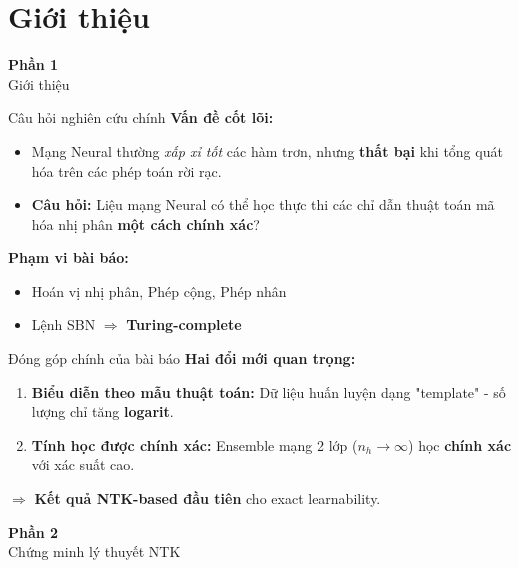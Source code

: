 
\section{Giới thiệu}

\begin{frame}{}
  \centering
  \vfill
  {\Huge \textbf{Phần 1}}\\[0.5cm]
  {\Large Giới thiệu}
  \vfill
\end{frame}

\begin{frame}{Câu hỏi nghiên cứu chính}
  \textbf{Vấn đề cốt lõi:}
  \begin{itemize}
    \item Mạng Neural thường \emph{xấp xỉ tốt} các hàm trơn, nhưng \textbf{thất bại} khi tổng quát hóa trên các phép toán rời rạc.
    \item \textbf{Câu hỏi:} Liệu mạng Neural có thể học thực thi các chỉ dẫn thuật toán mã hóa nhị phân \textbf{một cách chính xác}?
  \end{itemize}

  \vspace{0.3cm}
  \textbf{Phạm vi bài báo:}
  \begin{itemize}
    \item Hoán vị nhị phân, Phép cộng, Phép nhân
    \item Lệnh SBN $\Rightarrow$ \textbf{Turing-complete}
  \end{itemize}
\end{frame}

\begin{frame}{Đóng góp chính của bài báo}
  \textbf{Hai đổi mới quan trọng:}
  \begin{enumerate}
    \item \textbf{Biểu diễn theo mẫu thuật toán:} Dữ liệu huấn luyện dạng "template" - số lượng chỉ tăng \textbf{logarit}.
    \item \textbf{Tính học được chính xác:} Ensemble mạng 2 lớp ($n_h \to \infty$) học \textbf{chính xác} với xác suất cao.
  \end{enumerate}
  
  \vspace{0.3cm}
  $\Rightarrow$ \textbf{Kết quả NTK-based đầu tiên} cho exact learnability.
\end{frame}

\begin{frame}{}
  \centering
  \vfill
  {\Huge \textbf{Phần 2}}\\[0.5cm]
  {\Large Chứng minh lý thuyết NTK}
  \vfill
\end{frame}
